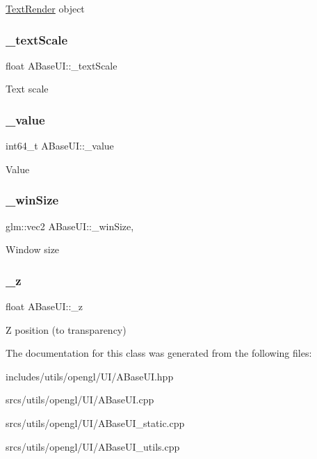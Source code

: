 \hyperlink{class_text_render}{Text\+Render} object \mbox{\label{class_a_base_u_i_a4424a672c8f3692ef6406153cedd586d}} 
\subsubsection{\texorpdfstring{\+\_\+text\+Scale}{\_textScale}}
{\footnotesize\ttfamily float A\+Base\+U\+I\+::\+\_\+text\+Scale\hspace{0.3cm}{\ttfamily [protected]}}

Text scale \mbox{\label{class_a_base_u_i_acaf5cb113d55cb7b2ab58c9834889936}} 
\subsubsection{\texorpdfstring{\+\_\+value}{\_value}}
{\footnotesize\ttfamily int64\+\_\+t A\+Base\+U\+I\+::\+\_\+value\hspace{0.3cm}{\ttfamily [protected]}}

Value \mbox{\label{class_a_base_u_i_acbb31dd0822594a71478ed71fdcfa15d}} 
\subsubsection{\texorpdfstring{\+\_\+win\+Size}{\_winSize}}
{\footnotesize\ttfamily glm\+::vec2 A\+Base\+U\+I\+::\+\_\+win\+Size\hspace{0.3cm}{\ttfamily [static]}, {\ttfamily [protected]}}

Window size \mbox{\label{class_a_base_u_i_a986f2d7749ff6696048a54655d666c43}} 
\subsubsection{\texorpdfstring{\+\_\+z}{\_z}}
{\footnotesize\ttfamily float A\+Base\+U\+I\+::\+\_\+z\hspace{0.3cm}{\ttfamily [protected]}}

Z position (to transparency) 

The documentation for this class was generated from the following files\+:\begin{DoxyCompactItemize}
\item 
includes/utils/opengl/\+U\+I/A\+Base\+U\+I.\+hpp\item 
srcs/utils/opengl/\+U\+I/A\+Base\+U\+I.\+cpp\item 
srcs/utils/opengl/\+U\+I/A\+Base\+U\+I\+\_\+static.\+cpp\item 
srcs/utils/opengl/\+U\+I/A\+Base\+U\+I\+\_\+utils.\+cpp\end{DoxyCompactItemize}

